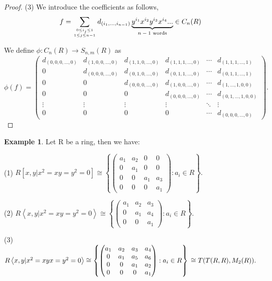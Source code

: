 \documentclass[12pt]{amsart}
\theoremstyle{definition}
\newtheorem{example}[theorem]{Example}
\begin{document}
\begin{proof}
(3) We introduce the coefficients as follows,
$$f= \sum_{0\le i_j \le 1\atop 1 \le j \le n-1}d_{(i_1, \dots , i_{n-1})}\underbrace{y^{i_1}x^{i_2}y^{i_3}x^{i_4}...}_{\text{$n-1$ words}}\in C_{n}(R)$$

We define $\phi :  C_{n}(R) \to  S_{n,m}(R)$ as 
$$\phi(f)=
\begin{pmatrix}
   d_{(0,0,0, \dots,0)} & d_{(1,0,0, \dots,0)} & d_{(1,1,0, \dots,0)} & d_{(1,1,1, \dots,0)} & \cdots & d_{(1,1,1, \dots,1)}\\
   0 & d_{(0,0,0, \dots,0)} & d_{(0,1,0, \dots,0)} & d_{(0,1,1, \dots,0)} & \cdots & d_{(0,1,1, \dots,1)} \\
   0 & 0 & d_{(0,0,0, \dots,0)} & d_{(1,0,0, \dots,0)} & \cdots & d_{(1,\dots,1,0,0)}\\
   0 & 0 & 0 & d_{(0,0,0, \dots,0)} & \cdots & d_{(0,1,\dots,1,0,0)} \\
   \vdots  & \vdots & \vdots & \vdots & \ddots & \vdots \\
   0 &  0 & 0  & 0  & \cdots & d_{(0,0,0, \dots,0)}
\end{pmatrix}.$$
\end{proof}

\begin{example}
Let R be a ring, then we have: 

(1) $R\left[ x,y | x^2=xy=y^2=0  \right] \cong \left\{  
\begin{pmatrix}
    a_1 & a_2 & 0 & 0 \\
    0 & a_1 & 0 & 0 \\
    0 & 0 & a_1 & a_3 \\
    0 & 0 & 0 & a_1
\end{pmatrix} : a_i \in R \right\}.
$

(2) $R\left\langle x,y | x^2=xy=y^2=0  \right\rangle \cong \left\{  
\begin{pmatrix}
    a_1 & a_2 & a_3 \\
    0 & a_1 & a_4 \\
    0 & 0 & a_1
\end{pmatrix} : a_i \in R \right\}. $

(3) $R\left\langle x,y | x^2=xyx=y^2=0  \right\rangle \cong \left\{  
\begin{pmatrix}
    a_1 & a_2 & a_3 & a_4 \\
    0 & a_1 & a_5 & a_6 \\
    0 & 0 & a_1 & a_2 \\
    0 & 0 & 0 & a_1
\end{pmatrix} : a_i \in R \right\}\\ \cong T(T(R,R), M_2(R)).$
    
\end{example}
\end{document}
